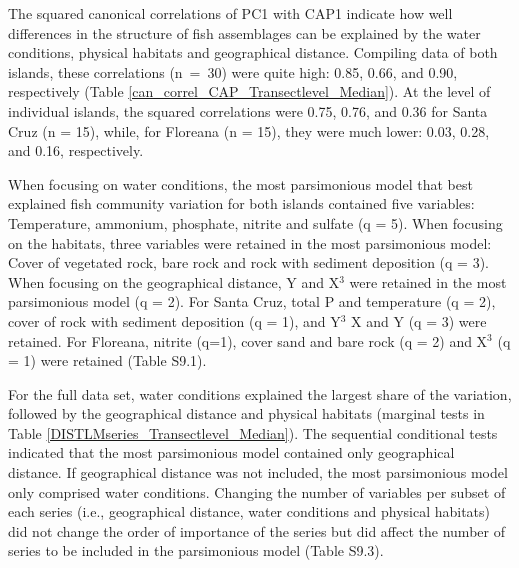 \documentclass[jmse,article,accept,moreauthors,pdftex]{Definitions/mdpi}
\begin{document}
\FloatBarrier

The squared canonical correlations of PC1 with CAP1 indicate how well differences in the structure of fish assemblages can be explained by the water conditions, physical habitats and geographical distance. Compiling data of both islands, these correlations \mbox{(n = 30)} were quite high: 0.85, 0.66, and 0.90, respectively (Table \ref{can_correl_CAP_Transectlevel_Median}). At the level of individual islands, the squared correlations were 0.75, 0.76, and 0.36 for Santa Cruz (n = 15), while, for Floreana (n = 15), they were much lower: 0.03, 0.28, and 0.16, respectively. 

When focusing on water conditions, the most parsimonious model that best explained fish community variation for both islands contained five variables: Temperature, ammonium, phosphate, nitrite and sulfate (q = 5). When focusing on the habitats, three variables were retained in the most parsimonious model: Cover of vegetated rock, bare rock and rock with sediment deposition (q = 3). When focusing on the geographical distance, Y and X$^{3}$ were retained in the most parsimonious model (q = 2). For Santa Cruz, total P and temperature (q = 2), cover of rock with sediment deposition (q = 1), and Y$^{3}$ X and Y (q = 3) were retained. For Floreana, nitrite (q=1), cover sand and bare rock (q = 2) and X$^{3}$ (q = 1) were retained (Table S9.1). 

For the full data set, water conditions explained the largest share of the variation, followed by the geographical distance and physical habitats (marginal tests in Table \ref{DISTLMseries_Transectlevel_Median}). The sequential conditional tests indicated that the most parsimonious model contained only geographical distance. If geographical distance was not included, the most parsimonious model only comprised water conditions. Changing the number of variables per subset of each series (i.e., geographical distance, water conditions and physical habitats) did not change the order of importance of the series but did affect the number of series to be included in the parsimonious model (Table S9.3).
\end{document}
